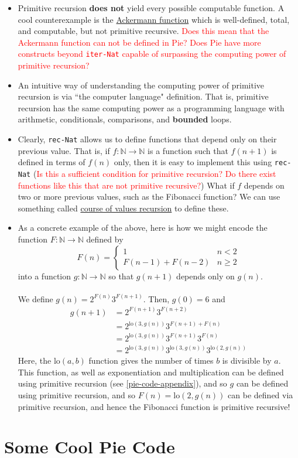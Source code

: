 \documentclass{article}
\newcommand{\ttt}[1]{\texttt{#1}}
\newcommand{\bb}[1]{\mathbb{#1}}
\newcommand{\bN}{\bb{N}}
\newcommand{\lo}{\mathrm{lo}}
\begin{document}
\begin{itemize}
    \item 
        Primitive recursion \textbf{does not} yield every possible computable function. A cool counterexample is the \href{https://en.wikipedia.org/wiki/Ackermann_function}{Ackermann function} which is well-defined, total, and computable, but not primitive recursive. \textcolor{red}{Does this mean that the Ackermann function can not be defined in Pie? Does Pie have more constructs beyond \ttt{iter-Nat} capable of surpassing the computing power of primitive recursion?}
    \item
        An intuitive way of understanding the computing power of primitive recursion is via ``the computer language" definition. That is, primitive recursion has the same computing power as a programming language with arithmetic, conditionals, comparisons, and \textbf{bounded} loops.
    \item
        Clearly, \ttt{rec-Nat} allows us to define functions that depend only on their previous value. That is, if \(f : \mathbb{N} \to \mathbb{N}\) is a function such that \(f(n + 1)\) is defined in terms of \(f(n)\) only, then it is easy to implement this using \ttt{rec-Nat} (\textcolor{red}{Is this a sufficient condition for primitive recursion? Do there exist functions like this that are not primitive recursive?}) What if \(f\) depends on two or more previous values, such as the Fibonacci function? We can use something called \href{https://en.wikipedia.org/wiki/Course-of-values_recursion}{course of values recursion} to define these.
    \item
        As a concrete example of the above, here is how we might encode the function \(F : \bN \to \bN\) defined by \[
            F(n) = \begin{cases}
                        1 & n < 2 \\
                        F(n - 1) + F(n - 2) & n \geq 2
                   \end{cases}
        \]
        into a function \(g : \bN \to \bN\) so that \(g(n + 1)\) depends only on \(g(n)\). 
        \\ \\
        We define \(g(n) = 2^{F(n)}3^{F(n + 1)}\). Then, \(g(0) = 6\) and \begin{align*}
            g(n + 1) &= 2^{F(n + 1)}3^{F(n + 2)} \\
                     &= 2^{\lo(3, g(n))}3^{F(n + 1) + F(n)} \\
                     &= 2^{\lo(3, g(n))}3^{F(n + 1)} 3^{F(n)} \\
                     &= 2^{\lo(3, g(n))}3^{\lo(3, g(n))} 3^{\lo(2, g(n))}
        \end{align*}
        Here, the \(\lo(a, b)\) function gives the number of times \(b\) is divisible by \(a\). This function, as well as exponentiation and multiplication can be defined using primitive recursion (see \autoref{pie-code-appendix}), and so \(g\) can be defined using primitive recursion, and so \(F(n) = \lo(2, g(n))\) can be defined via primitive recursion, and hence the Fibonacci function is primitive recursive!  
\end{itemize}

\appendix
\section{Some Cool Pie Code} \label{pie-code-appendix}

\end{document}
